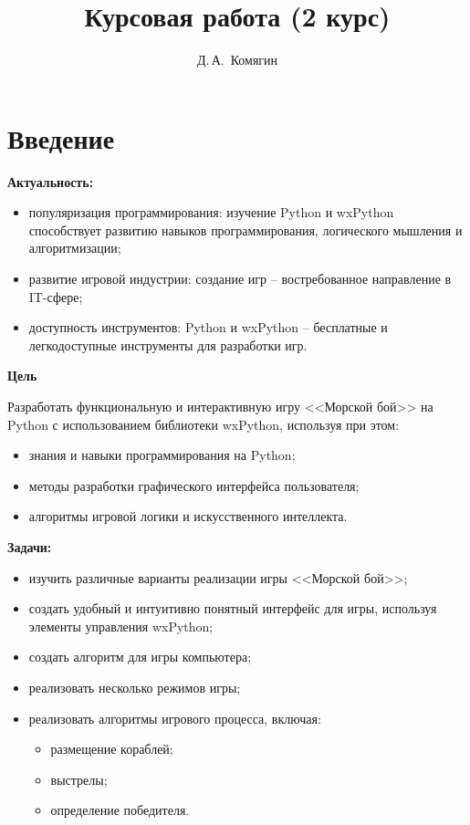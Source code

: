 \documentclass[14pt, oneside]{altsu-report}
\title{Курсовая работа (2 курс)}
\author{Д.\,А.~Комягин}
\institute{Институт цифровых технологий, электроники и физики}
\date{\the\year}
\begin{document}
\maketitle

\setcounter{page}{2}
\makeabstract
\tableofcontents

\chapter*{Введение}

\textbf{Актуальность:}
\begin{itemize}
\item популяризация программирования: изучение Python и wxPython способствует развитию навыков программирования, логического мышления и алгоритмизации;
\item развитие игровой индустрии: создание игр – востребованное направление в IT-сфере;
\item доступность инструментов: Python и wxPython – бесплатные и легкодоступные инструменты для разработки игр.
\end{itemize}

\textbf{Цель}

Разработать функциональную и интерактивную игру <<Морской бой>> на Python с использованием библиотеки wxPython, используя при этом:
\begin{itemize}
\item знания и навыки программирования на Python;
\item методы разработки графического интерфейса пользователя;
\item алгоритмы игровой логики и искусственного интеллекта.
\end{itemize}

\textbf{Задачи:}

\begin{itemize}
\item изучить различные варианты реализации игры <<Морской бой>>;
\item создать удобный и интуитивно понятный интерфейс для игры, используя элементы управления wxPython;
\item создать алгоритм для игры компьютера;
\item реализовать несколько режимов игры;
\item реализовать алгоритмы игрового процесса, включая:
\begin{itemize}
    \item размещение кораблей;
    \item выстрелы;
    \item определение победителя.
\end{itemize}
\end{itemize}
\end{document}
